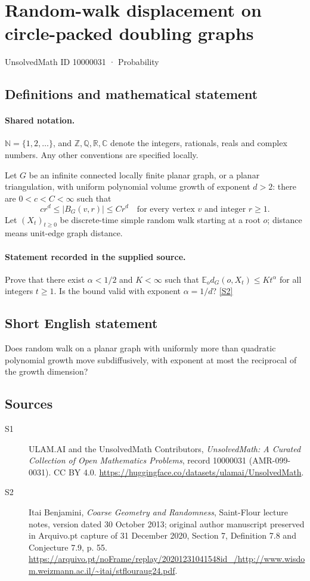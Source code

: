 \documentclass[11pt]{article}
\newcommand{\sref}[2]{\hyperlink{source:#1:#2}{[S#2]}}
\begin{document}
\setcounter{section}{10000030}
\section{Random-walk displacement on circle-packed doubling graphs}\label{10000031}
{\small\sffamily UnsolvedMath ID 10000031 · Probability}
\subsection{Definitions and mathematical statement}

\paragraph{Shared notation.}$\mathbb N=\{1,2,\ldots\}$, and $\mathbb Z,\mathbb Q,\mathbb R,\mathbb C$ denote the integers, rationals, reals and complex numbers. Any other conventions are specified locally.


Let $G$ be an infinite connected locally finite planar graph, or a planar triangulation, with uniform polynomial volume growth of exponent $d>2$: there are $0<c<C<\infty$ such that
\[c r^d\le |B_G(v,r)|\le C r^d\quad\text{for every vertex }v\text{ and integer }r\ge1.\]
Let $(X_t)_{t\ge0}$ be discrete-time simple random walk starting at a root $o$; distance means unit-edge graph distance.
\paragraph{Statement recorded in the supplied source.}
Prove that there exist $\alpha<1/2$ and $K<\infty$ such that $\mathbb E_o d_G(o,X_t)\le Kt^\alpha$ for all integers $t\ge1$. Is the bound valid with exponent $\alpha=1/d$? \sref{10000031}{2}
\subsection{Short English statement}
Does random walk on a planar graph with uniformly more than quadratic polynomial growth move subdiffusively, with exponent at most the reciprocal of the growth dimension?
\subsection{Sources}
\begin{description}
\item[\hypertarget{source:10000031:1}{S1}] ULAM.AI and the UnsolvedMath Contributors, \emph{UnsolvedMath: A Curated Collection of Open Mathematics Problems}, record 10000031 (AMR-099-0031). CC BY 4.0. \url{https://huggingface.co/datasets/ulamai/UnsolvedMath}.
\item[\hypertarget{source:10000031:2}{S2}] Itai Benjamini, \emph{Coarse Geometry and Randomness}, Saint-Flour lecture notes, version dated 30 October 2013; original author manuscript preserved in Arquivo.pt capture of 31 December 2020, Section 7, Definition 7.8 and Conjecture 7.9, p. 55. \url{https://arquivo.pt/noFrame/replay/20201231041548id_/http://www.wisdom.weizmann.ac.il/~itai/stflouraug24.pdf}.
\end{description}
\label{end:10000031}
\end{document}
